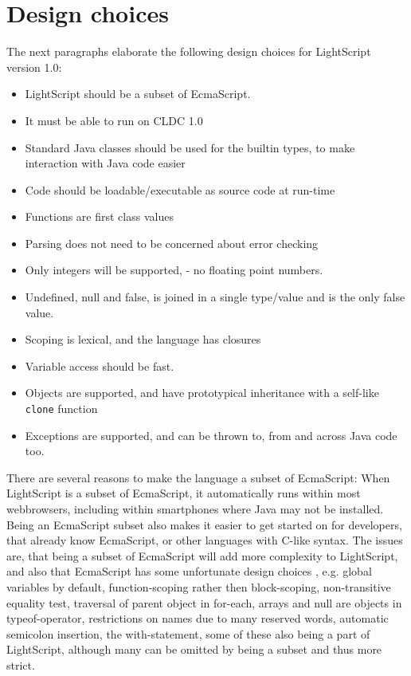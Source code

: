 \documentclass[11pt]{report}
\begin{document}
\section{Design choices}
\label{lightscript-design}
The next paragraphs elaborate the following design choices for LightScript version 1.0:
\begin{itemize}
\item LightScript should be a subset of EcmaScript.
\item It must be able to run on CLDC 1.0
\item Standard Java classes should be used for the builtin types, to make interaction with Java code easier
\item Code should be loadable/executable as source code at run-time
\item Functions are first class values
\item Parsing does not need to be concerned about error checking
\item Only integers will be supported, - no floating point numbers.
\item Undefined, null and false, is joined in a single type/value and is the only false value.
\item Scoping is lexical, and the language has closures
\item Variable access should be fast.
\item Objects are supported, and have prototypical inheritance with a self-like \verb|clone| function
\item Exceptions are supported, and can be thrown to, from and across Java code too.
\end{itemize}

There are several reasons to make the language a subset of EcmaScript:
When LightScript is a subset of EcmaScript, it automatically runs within most webbrowsers, including within smartphones where Java may not be installed.
Being an EcmaScript subset also makes it easier to get started on for developers, that already know EcmaScript, or other languages with C-like syntax.
The issues are, that being a subset of EcmaScript will add more complexity to LightScript, and also that EcmaScript has some unfortunate design choices \cite{crockford-web}, e.g. global variables by default, function-scoping rather then block-scoping, non-transitive equality test, traversal of parent object in for-each, arrays and null are objects in typeof-operator, restrictions on names due to many reserved words, automatic semicolon insertion, the with-statement, 
some of these also being a part of LightScript,
although many can be omitted by being a subset and thus more strict. 
\end{document}
